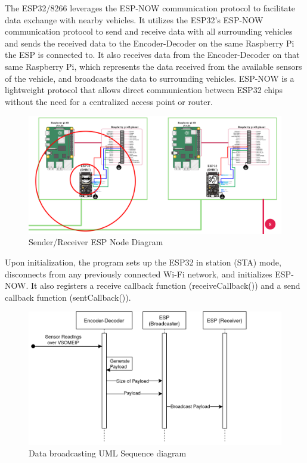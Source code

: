 \documentclass[
12pt,
oneside, 
onehalfspacing, 
nolistspacing, 
parskip, 
chapterinoneline, 
]{AASTCOMPUTER}
\begin{document}
The ESP32/8266 leverages the ESP-NOW communication protocol to facilitate data exchange with nearby vehicles. It utilizes the ESP32's ESP-NOW communication protocol to send and receive data with all surrounding vehicles and sends the received data to the Encoder-Decoder on the same Raspberry Pi the ESP is connected to. It also receives data from the Encoder-Decoder on that same Raspberry Pi, which represents the data received from the available sensors of the vehicle, and broadcasts the data to surrounding vehicles. ESP-NOW is a lightweight protocol that allows direct communication between ESP32 chips without the need for a centralized access point or router.

\begin{figure}[!ht]
\centering
\includegraphics[scale=0.2]{Figures/7.png}
\caption[Sender/Receiver ESP Node Diagram]{Sender/Receiver ESP Node Diagram}
\label{fig:TCU}
\end{figure}

Upon initialization, the program sets up the ESP32 in station (STA) mode, disconnects from any previously connected Wi-Fi network, and initializes ESP-NOW. It also registers a receive callback function (receiveCallback()) and a send callback function (sentCallback()).
\begin{figure}[!ht]
\centering
\includegraphics[scale=0.5]{Figures/8.png}
\caption[Data broadcasting UML Sequence diagram]{Data broadcasting UML Sequence diagram}
\label{fig:TCU}
\end{figure}
\end{document}
